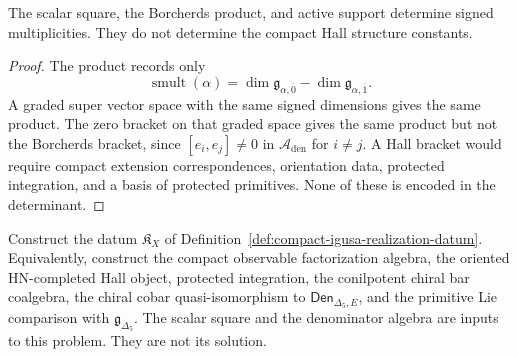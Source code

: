 \documentclass[11pt]{memoir}
\newcommand{\smult}{\operatorname{smult}}
\begin{document}
\begin{proposition}
\label{prop:determinant-does-not-determine-hall-constants}
The scalar square, the Borcherds product, and active support determine
signed multiplicities.  They do not determine the compact Hall
structure constants.
\end{proposition}

\begin{proof}
The product records only
$$
\smult(\alpha)
=\dim\mathfrak g_{\alpha,\overline0}
-\dim\mathfrak g_{\alpha,\overline1}.
$$
A graded super vector space with the same signed dimensions gives the
same product.  The zero bracket on that graded space gives the same
product but not the Borcherds bracket, since
\([e_i,e_j]\ne0\) in \(\mathcal A_{\mathrm{den}}\) for \(i\ne j\).
A Hall bracket would require compact extension correspondences,
orientation data, protected integration, and a basis of protected
primitives.  None of these is encoded in the determinant.
\end{proof}

\begin{openproblem}
Construct the datum
\(\mathfrak K_X\) of Definition~\ref{def:compact-igusa-realization-datum}.
Equivalently, construct the compact observable factorization algebra,
the oriented HN-completed Hall object, protected integration,
the conilpotent chiral bar coalgebra, the chiral cobar
quasi-isomorphism to \(\mathsf{Den}_{\Delta_5,E}\), and the primitive
Lie comparison with \(\mathfrak g_{\Delta_5}\).  The scalar square and
the denominator algebra are inputs to this problem.  They are not its
solution.
\end{openproblem}
\end{document}
